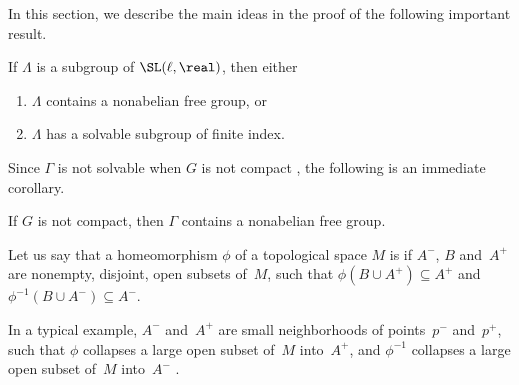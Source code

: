 In this section, we describe the main ideas in the proof
of the following important result.

\begin{thm}
\label{TitsAlternative}
 If $\Lambda$ is a subgroup of\/ $\SL(\ell,\real)$, then
either%
 \begin{enumerate}
 \item $\Lambda$ contains a nonabelian free group, or
 \item $\Lambda$ has a solvable subgroup of finite index.
 \end{enumerate}
 \end{thm}

Since $\Gamma$ is not solvable when $G$ is not compact ,
the following is an immediate corollary.

\begin{cor} \label{FreeInGamma}
 If $G$ is not compact, then\/ $\Gamma$ contains a nonabelian
free group.
 \end{cor}

\begin{defn}
 Let us say that a homeomorphism $\phi$ of a topological
space $M$ is  if $A^-$,
$B$ and~$A^+$ are nonempty, disjoint, open subsets of~$M$,
such that $\phi(B \cup A^+) \subseteq A^+$ and $\phi^{-1}(B
\cup A^-) \subseteq A^-$.
 \end{defn}

In a typical example, $A^-$ and~$A^+$ are small
neighborhoods of points~$p^-$ and~$p^+$, such that $\phi$
collapses a large open subset of~$M$ into~$A^+$, and
$\phi^{-1}$ collapses a large open subset of~$M$
into~$A^-$ .

